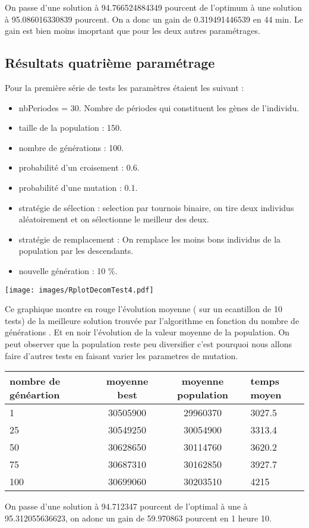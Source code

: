 \documentclass[a4paper]{report}
\begin{document}
On passe d'une solution à 94.766524884349 pourcent de l'optimum à une solution à 95.086016330839 pourcent. On a donc un gain de 0.319491446539 en 44 min. Le gain est bien moins imoprtant que pour les deux autres paramétrages.
\subsection{Résultats quatrième paramétrage}
Pour la première série de tests les paramètres étaient les suivant :\\

\begin{itemize}
\item nbPeriodes = 30. Nombre de périodes qui constituent les gènes de l'individu.
\item taille de la population : 150.
\item nombre de générations : 100.
\item probabilité d'un croisement : 0.6.
\item probabilité d'une mutation : 0.1.
\item stratégie de sélection : selection par tournois binaire, on tire deux individus aléatoirement et on sélectionne le meilleur des deux.
\item stratégie de remplacement : On remplace les moins bons individus de la population par les descendants.
\item nouvelle génération : 10 $\%$.

\end{itemize}
\begin{center}
\texttt{[image: images/RplotDecomTest4.pdf]}
\end{center}
Ce graphique montre  en rouge l'évolution moyenne ( sur un ecantillon de 10 tests) de la  meilleure solution trouvée par l'algorithme en fonction du nombre de générations . Et en noir l'évolution de la valeur moyenne de la population. On peut observer que la population reste peu diversifier c'est pourquoi nous allons faire d'autres tests en faisant varier les parametres de mutation.\\
\begin{tabular}{|l|c|c|l|}
  \hline
  nombre de généartion &moyenne best &moyenne population&temps moyen\\

  \hline
 1 &30505900&29960370&3027.5\\
  \hline
25 & 30549250&30054900& 3313.4
\\
  \hline
  50&  30628650&30114760&3620.2
\\
  \hline
  75 &30687310&30162850&3927.7


\\
  \hline
 100 &  30699060&30203510& 4215 \\
  \hline


\end{tabular}
On passe d'une solution à 94.712347 pourcent de l'optimal à  une à 95.312055636623, on adonc un gain de 59.970863 pourcent en 1 heure 10.
\end{document}
